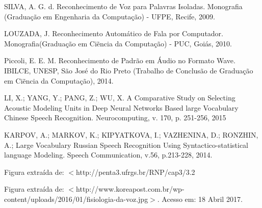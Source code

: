 \documentclass[a4paper,12pt,twoside,openright]{report}
\begin{document}
\begin{thebibliography}{00}
\begin{singlespace}
	SILVA, A. G. d. Reconhecimento de Voz para Palavras Isoladas. Monografia (Gradua{\c c}\~{a}o em Engenharia da Computa{\c c}\~{a}o) - UFPE, Recife, 2009.
\end{singlespace}

\begin{singlespace}
	LOUZADA, J. Reconhecimento Autom\'{a}tico de Fala por Computador. Monografia(Gradua{\c c}\~{a}o em Ci\~{e}ncia da Computa{\c c}\~{a}o) - PUC, Goi\'{a}s, 2010.
\end{singlespace}

\begin{singlespace}
Piccoli, E. E. M. Reconhecimento de Padr\~{a}o em \'{A}udio no Formato Wave. IBILCE, UNESP, S\~{a}o Jos\'{e} do Rio Preto (Trabalho de Conclus\~{a}o de Gradua{\c c}\~{a}o em Ci\~{e}ncia da Computa{\c c}\~{a}o), 2014.
\end{singlespace}

\begin{singlespace}
	LI, X.; YANG, Y.; PANG, Z.; WU, X. A Comparative Study on Selecting Acoustic Modeling Units in Deep Neural Networks Based large Vocabulary Chinese Speech Recognition. Neurocomputing, v. 170, p. 251-256, 2015
\end{singlespace}

\begin{singlespace}
	KARPOV, A.; MARKOV, K.; KIPYATKOVA, I.; VAZHENINA, D.; RONZHIN, A.; Large Vocabulary Russian Speech Recognition Using Syntactico-statistical language Modeling. Speech Communication, v.56, p.213-228, 2014.
\end{singlespace}

\begin{singlespace}
	Figura extra\'{i}da de: $<$http://penta3.ufrgs.br/RNP/cap3/3.2%
\end{singlespace}

\begin{singlespace}
	Figura extra\'{i}da de: $<$http://www.koreapost.com.br/wp-content/uploads/2016/01/fisiologia-da-voz.jpg$>$. Acesso em: 18 Abril 2017. 
\end{singlespace}



\end{thebibliography}
\thispagestyle{myheadings}
\newpage\ \thispagestyle{myheadings} \newpage
\thispagestyle{myheadings}
\end{document}
